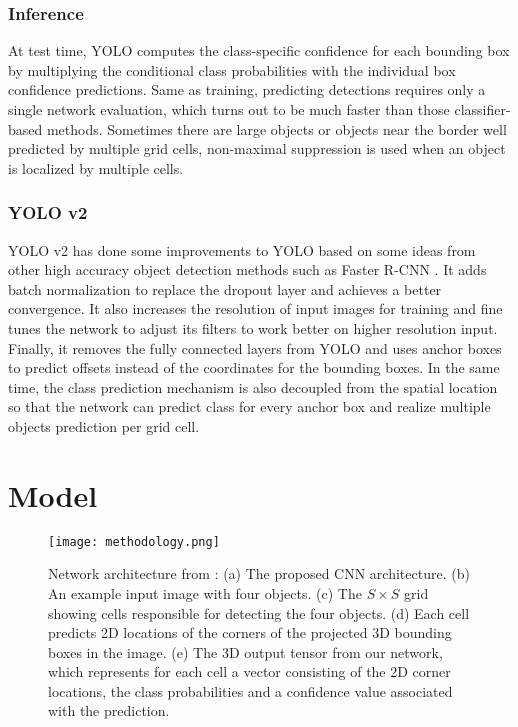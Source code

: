 \subsubsection{Inference}

At test time, YOLO computes the class-specific confidence for each bounding box by multiplying the conditional class probabilities with the individual box confidence predictions. Same as training, predicting detections requires only a single network evaluation, which turns out to be much faster than those classifier-based methods. Sometimes there are large objects or objects near the border well predicted by multiple grid cells, non-maximal suppression is used when an object is localized by multiple cells.

\subsubsection{YOLO v2}
YOLO v2 has done some improvements to YOLO based on some ideas from other high accuracy object detection methods such as Faster R-CNN \cite{}. It adds batch normalization to replace the dropout layer and achieves a better convergence. It also increases the resolution of input images for training and fine tunes the network to adjust its filters to work better on higher resolution input. Finally, it removes the fully connected layers from YOLO and uses anchor boxes to predict offsets instead of the coordinates for the bounding boxes. In the same time, the class prediction mechanism is also decoupled from the spatial location so that the network can predict class for every anchor box and realize multiple objects prediction per grid cell.

\section{Model}

\begin{figure}
  \texttt{[image: methodology.png]}
  \caption{Network architecture from \cite{tekin2018real}: (a) The proposed CNN architecture. (b) An example input image with four objects. (c) The $S \times S$ grid showing cells responsible for detecting the four objects. (d) Each cell predicts 2D locations of the corners of the projected 3D bounding boxes in the image. (e) The 3D output tensor from our network, which represents for each cell a vector consisting of the 2D corner locations, the class probabilities and a confidence value associated with the prediction.}
  \label{fig:methodology}
\end{figure}

